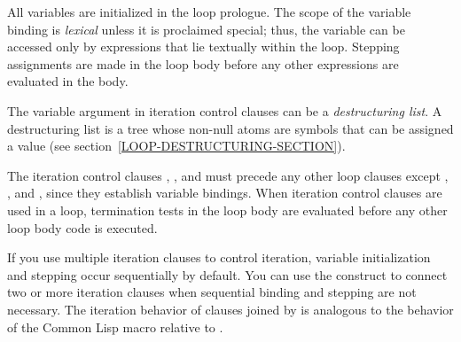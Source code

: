 All variables are initialized in the loop prologue.  The scope of
the variable binding is {\it lexical} unless it is proclaimed
special; thus, the variable can be
accessed only by expressions that lie textually within the loop.
Stepping assignments are made in the loop body before any other expressions
are evaluated in the body.

The variable argument in iteration control clauses can be a 
{\it destructuring list}.  A destructuring list
is a tree whose non-null atoms are symbols that
can be assigned a value (see section~\ref{LOOP-DESTRUCTURING-SECTION}).

The iteration control clauses , , and  
must precede any other loop clauses except
, , and ,
since they establish variable bindings.  When iteration control clauses are
used in a loop, termination tests in the loop body are evaluated
before any other loop body code is executed.

If you use multiple iteration clauses to control iteration, variable
initialization and stepping occur sequentially by default.  
You can use the  construct to connect two or more
iteration clauses when sequential binding and stepping are not necessary.
The iteration behavior of clauses joined by 
is analogous to the behavior of the Common Lisp macro 
relative to .

